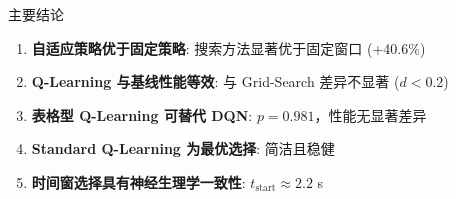 \begin{frame}{主要结论}
    \begin{enumerate}
        \item \textbf{自适应策略优于固定策略}: 搜索方法显著优于固定窗口 (+40.6\%)
        \item \textbf{Q-Learning 与基线性能等效}: 与 Grid-Search 差异不显著 ($d < 0.2$)
        \item \textbf{表格型 Q-Learning 可替代 DQN}: $p = 0.981$，性能无显著差异
        \item \textbf{Standard Q-Learning 为最优选择}: 简洁且稳健
        \item \textbf{时间窗选择具有神经生理学一致性}: $t_{\text{start}} \approx 2.2$ s
    \end{enumerate}
\end{frame}
